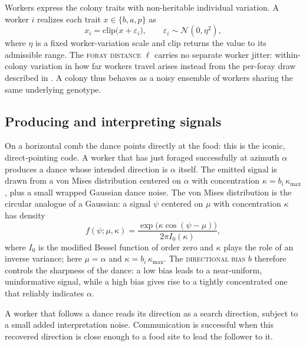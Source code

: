 \documentclass[11pt]{article}
\newcommand{\trait}[1]{\textsc{#1}}
\begin{document}
Workers express the colony traits with non-heritable individual variation. A
worker $i$ realizes each trait $x \in \{b, a, p\}$ as
\begin{equation}
  x_i = \mathrm{clip}\bigl(x + \varepsilon_i\bigr), \qquad
  \varepsilon_i \sim \mathcal{N}(0, \eta^2),
\end{equation}
where $\eta$ is a fixed worker-variation scale and $\mathrm{clip}$ returns the
value to its admissible range. The \trait{foray distance} $\ell$ carries no separate
worker jitter: within-colony variation in how far workers travel arises instead
from the per-foray draw described in . A colony thus
behaves as a noisy ensemble of workers sharing the same underlying genotype.

\subsection{Producing and interpreting signals}
\label{sec:signals}
On a horizontal comb the dance points directly at the food: this is the iconic,
direct-pointing code. A worker that has just foraged successfully at azimuth $\alpha$
produces a dance whose intended direction is $\alpha$ itself. The emitted signal is
drawn from a von Mises distribution centered on $\alpha$ with concentration
$\kappa = b_i\,\kappa_{\max}$, plus a small wrapped Gaussian dance noise. The von
Mises distribution is the circular analogue of a Gaussian: a signal $\psi$
centered on $\mu$ with concentration $\kappa$ has density
\begin{equation}
  f(\psi;\mu,\kappa) = \frac{\exp\bigl(\kappa\cos(\psi-\mu)\bigr)}{2\pi I_0(\kappa)},
\end{equation}
where $I_0$ is the modified Bessel function of order zero and $\kappa$ plays the
role of an inverse variance; here $\mu = \alpha$ and $\kappa = b_i\,\kappa_{\max}$.
The \trait{directional bias} $b$ therefore
controls the sharpness of the dance: a low bias leads to a near-uniform,
uninformative signal, while a high bias gives rise to a tightly concentrated one that
reliably indicates $\alpha$.

A worker that follows a dance reads its direction as a search direction, subject
to a small added interpretation noise. Communication is successful when this
recovered direction is close enough to a food site to lead the follower to it.
\end{document}
